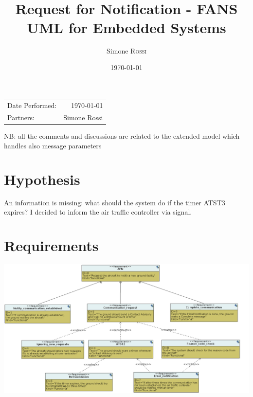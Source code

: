 \documentclass{article}
\title{Request for Notification - FANS\\ UML for Embedded Systems} %
\author{Simone \textsc{Rossi}} %
\date{\today} %
\begin{document}
\maketitle %

\begin{center}
\begin{tabular}{l r}
Date Performed: & \today \\ %
Partners: & Simone Rossi \\ %
\end{tabular}
\end{center}


NB: all the comments and discussions are related to the extended model which handles also 
message parameters

\section{Hypothesis}
An information is missing: what should the system do if the timer ATST3 expires? I decided to 
inform the air traffic controller via signal. 

\section{Requirements}
\includegraphics[width=\textwidth]{./lab2_10.png}
\end{document}
